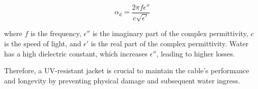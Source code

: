 \[
\alpha_d = \frac{2\pi f \epsilon''}{c \sqrt{\epsilon'}}
\]

where \( f \) is the frequency, \( \epsilon'' \) is the imaginary part of the complex permittivity, \( c \) is the speed of light, and \( \epsilon' \) is the real part of the complex permittivity. Water has a high dielectric constant, which increases \( \epsilon'' \), leading to higher losses.

Therefore, a UV-resistant jacket is crucial to maintain the cable’s performance and longevity by preventing physical damage and subsequent water ingress.


